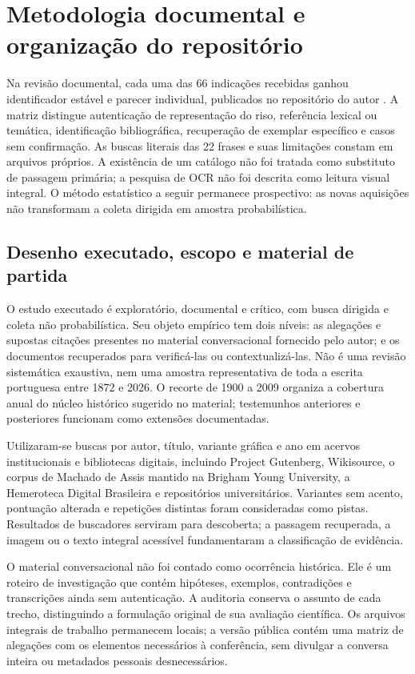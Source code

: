 \section{Metodologia documental e organização do repositório}
Na revisão documental, cada uma das 66 indicações recebidas ganhou identificador estável e parecer individual, publicados no repositório do autor \cite{souzaRepositorio2026}. A matriz distingue autenticação de representação do riso, referência lexical ou temática, identificação bibliográfica, recuperação de exemplar específico e casos sem confirmação. As buscas literais das 22 frases e suas limitações constam em arquivos próprios. A existência de um catálogo não foi tratada como substituto de passagem primária; a pesquisa de OCR não foi descrita como leitura visual integral. O método estatístico a seguir permanece prospectivo: as novas aquisições não transformam a coleta dirigida em amostra probabilística.
\subsection{Desenho executado, escopo e material de partida}
O estudo executado é exploratório, documental e crítico, com busca dirigida e coleta não probabilística. Seu objeto empírico tem dois níveis: as alegações e supostas citações presentes no material conversacional fornecido pelo autor; e os documentos recuperados para verificá-las ou contextualizá-las. Não é uma revisão sistemática exaustiva, nem uma amostra representativa de toda a escrita portuguesa entre 1872 e 2026. O recorte de 1900 a 2009 organiza a cobertura anual do núcleo histórico sugerido no material; testemunhos anteriores e posteriores funcionam como extensões documentadas.

Utilizaram-se buscas por autor, título, variante gráfica e ano em acervos institucionais e bibliotecas digitais, incluindo Project Gutenberg, Wikisource, o corpus de Machado de Assis mantido na Brigham Young University, a Hemeroteca Digital Brasileira e repositórios universitários. Variantes sem acento, pontuação alterada e repetições distintas foram consideradas como pistas. Resultados de buscadores serviram para descoberta; a passagem recuperada, a imagem ou o texto integral acessível fundamentaram a classificação de evidência.

O material conversacional não foi contado como ocorrência histórica. Ele é um roteiro de investigação que contém hipóteses, exemplos, contradições e transcrições ainda sem autenticação. A auditoria conserva o assunto de cada trecho, distinguindo a formulação original de sua avaliação científica. Os arquivos integrais de trabalho permanecem locais; a versão pública contém uma matriz de alegações com os elementos necessários à conferência, sem divulgar a conversa inteira ou metadados pessoais desnecessários.

